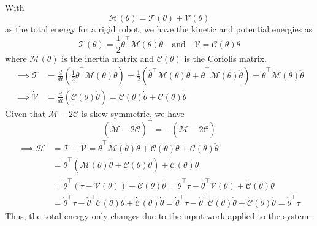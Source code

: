 With
\begin{equation*}
    \mathcal{H}(\theta)
    =
    \mathcal{T}(\theta)
    +
    \mathcal{V}(\theta)
\end{equation*}
as the total energy for a rigid robot, we have the kinetic and potential energies as
\begin{equation*}
    \mathcal{T}(\theta)
    =
    \frac{1}{2} \dot{\theta}^{\top} \mathcal{M}(\theta) \dot{\theta}
    \quad \text{and} \quad
    \mathcal{V}
    =
    \mathcal{C}(\theta) \dot{\theta}
\end{equation*}
where \( \mathcal{M}(\theta) \) is the inertia matrix and \( \mathcal{C}(\theta) \) is the Coriolis matrix.
\begin{align*}
    \implies
    \dot{\mathcal{T}}
     & =
    \frac{d}{dt} \left( \frac{1}{2} \dot{\theta}^{\top} \mathcal{M}(\theta) \dot{\theta} \right)
    =
    \frac{1}{2} \left( \ddot{\theta}^{\top} \mathcal{M}(\theta) \dot{\theta} + \dot{\theta}^{\top} \mathcal{M}(\theta) \ddot{\theta} \right)
    =
    \dot{\theta}^{\top} \mathcal{M}(\theta) \ddot{\theta}
    \\
    \implies
    \dot{\mathcal{V}}
     & =
    \frac{d}{dt} \left( \mathcal{C}(\theta) \dot{\theta} \right)
    =
    \dot{\mathcal{C}}(\theta) \dot{\theta} + \mathcal{C}(\theta) \ddot{\theta}
\end{align*}
Given that \( \dot{\mathcal{M}}-2 \mathcal{C} \) is skew-symmetric, we have
\begin{equation*}
    {\left( \dot{\mathcal{M}}-2 \mathcal{C} \right)}^{\top}
    =
    -\left( \dot{\mathcal{M}}-2 \mathcal{C} \right)
\end{equation*}
\begin{align*}
    \implies
    \dot{\mathcal{H}}
     & =
    \dot{\mathcal{T}} + \dot{\mathcal{V}}
    =
    \dot{\theta}^{\top} \mathcal{M}(\theta) \ddot{\theta} + \dot{\mathcal{C}}(\theta) \dot{\theta} + \mathcal{C}(\theta) \ddot{\theta}
    \\ & =
    \dot{\theta}^{\top} \left( \mathcal{M}(\theta) \ddot{\theta} + \mathcal{C}(\theta) \dot{\theta} \right) + \dot{\mathcal{C}}(\theta) \dot{\theta}
    \\ & =
    \dot{\theta}^{\top} \left( \tau - \mathcal{V}(\theta) \right) + \dot{\mathcal{C}}(\theta) \dot{\theta}
    =
    \dot{\theta}^{\top} \tau - \dot{\theta}^{\top} \mathcal{V}(\theta) + \dot{\mathcal{C}}(\theta) \dot{\theta}
    \\ & =
    \dot{\theta}^{\top} \tau - \dot{\theta}^{\top} \mathcal{C}(\theta) \dot{\theta} + \dot{\mathcal{C}}(\theta) \dot{\theta}
    =
    \dot{\theta}^{\top} \tau - \dot{\theta}^{\top} \mathcal{C}(\theta) \dot{\theta} + \dot{\mathcal{C}}(\theta) \dot{\theta}
    =
    \dot{\theta}^{\top} \tau
\end{align*}
Thus, the total energy only changes due to the input work applied to the system.
